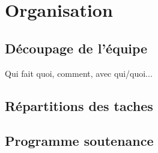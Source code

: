 \section{Organisation}
\subsection{Découpage de l'équipe}
Qui fait quoi, comment, avec qui/quoi...

\subsection{Répartitions des taches}

\subsection{Programme soutenance}